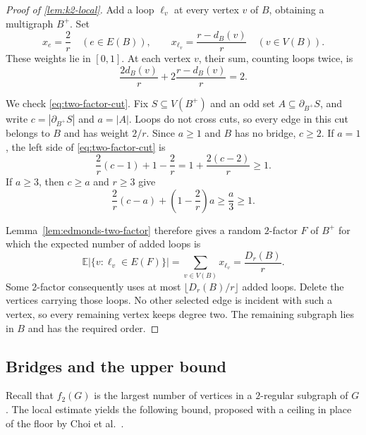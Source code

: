 \documentclass[10pt,a4paper]{amsart}
\newtheorem{proposition}[theorem]{Proposition}
\newcommand{\E}{\mathbb E}
\begin{document}
\begin{proof}[Proof of \cref{lem:k2-local}]
Add a loop $\ell_v$ at every vertex $v$ of $B$, obtaining a multigraph $B^+$. Set
\[
x_e=\frac2r\quad(e\in E(B)),
\qquad
x_{\ell_v}=\frac{r-d_B(v)}r\quad(v\in V(B)).
\]
These weights lie in $[0,1]$. At each vertex $v$, their sum, counting loops twice, is
\[
\frac{2d_B(v)}r+2\frac{r-d_B(v)}r=2.
\]

We check \eqref{eq:two-factor-cut}. Fix $S\subseteq V(B^+)$ and an odd set $A\subseteq\partial_{B^+}S$, and write $c=|\partial_{B^+}S|$ and $a=|A|$. Loops do not cross cuts, so every edge in this cut belongs to $B$ and has weight $2/r$. Since $a\ge1$ and $B$ has no bridge, $c\ge2$. If $a=1$, the left side of \eqref{eq:two-factor-cut} is
\[
\frac2r(c-1)+1-\frac2r
=1+\frac{2(c-2)}r\ge1.
\]
If $a\ge3$, then $c\ge a$ and $r\ge3$ give
\[
\frac2r(c-a)+\left(1-\frac2r\right)a
\ge\frac a3\ge1.
\]

Lemma~\ref{lem:edmonds-two-factor} therefore gives a random $2$-factor $F$ of $B^+$ for which the expected number of added loops is
\[
\E\bigl|\{v:\ell_v\in E(F)\}\bigr|
=\sum_{v\in V(B)}x_{\ell_v}
=\frac{D_r(B)}r.
\]
Some $2$-factor consequently uses at most $\lfloor D_r(B)/r\rfloor$ added loops. Delete the vertices carrying those loops. No other selected edge is incident with such a vertex, so every remaining vertex keeps degree two. The remaining subgraph lies in $B$ and has the required order.
\end{proof}

\subsection{Bridges and the upper bound}

Recall that $f_2(G)$ is the largest number of vertices in a $2$-regular subgraph of $G$. The local estimate yields the following bound, proposed with a ceiling in place of the floor by Choi et al.~\cite[Section~1]{CKKPW2019}.

\end{document}
